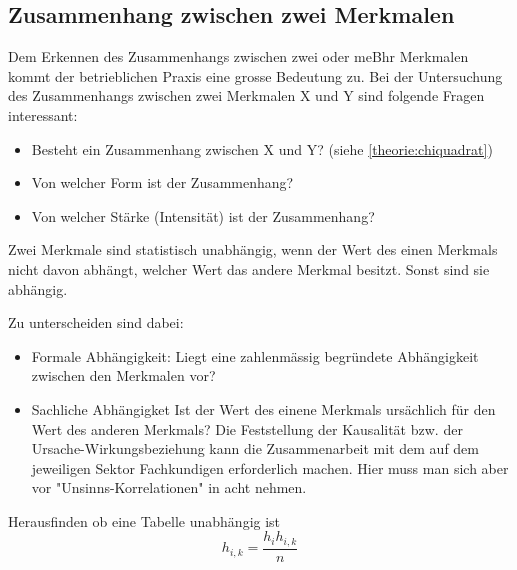 \subsection{Zusammenhang zwischen zwei Merkmalen}
Dem Erkennen des Zusammenhangs zwischen zwei oder meBhr Merkmalen kommt der betrieblichen Praxis eine grosse Bedeutung zu. Bei der Untersuchung des Zusammenhangs zwischen zwei Merkmalen X und Y sind folgende Fragen interessant:
\begin{itemize}
\item Besteht ein Zusammenhang zwischen X und Y? (siehe \autoref{theorie:chiquadrat})
\item Von welcher Form ist der Zusammenhang?
\item Von welcher Stärke (Intensität) ist der Zusammenhang?
\end{itemize}
\begin{tcolorbox}[colback=green!5,colframe=green!40!black, title=Abhängigkeit]
Zwei Merkmale sind statistisch unabhängig, wenn der Wert des einen Merkmals nicht davon abhängt, welcher Wert das andere Merkmal besitzt. Sonst sind sie abhängig.
\end{tcolorbox}
\pagebreak[4]
Zu unterscheiden sind dabei:
\begin{itemize}
\item Formale Abhängigkeit: 
\subitem Liegt eine zahlenmässig begründete Abhängigkeit zwischen den Merkmalen vor?
\item Sachliche Abhängigket
\subitem Ist der Wert des einene Merkmals ursächlich für den Wert des anderen Merkmals? Die Feststellung der Kausalität bzw. der Ursache-Wirkungsbeziehung kann die Zusammenarbeit mit dem auf dem jeweiligen Sektor Fachkundigen erforderlich machen. Hier muss man sich aber vor "Unsinns-Korrelationen" in acht nehmen.
\end{itemize}
Herausfinden ob eine Tabelle unabhängig ist
\begin{equation}\label{eq:zusammenhang:1}
h_{i,k}=\frac{h_i h_{i,k}}{n}
\end{equation}
